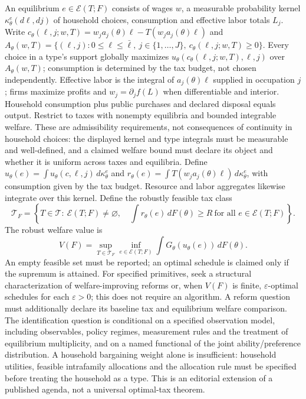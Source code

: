 \documentclass[11pt,a4paper]{article}
\begin{document}
An equilibrium \(e\in\mathcal E(T;F)\) consists of wages \(w\), a measurable probability kernel \(\kappa_\theta^e(d\ell,dj)\) of household choices, consumption and effective labor totals \(L_j\). Write \(c_\theta(\ell,j;w,T)=w_ja_j(\theta)\ell-T(w_ja_j(\theta)\ell)\) and \(A_\theta(w,T)=\{(\ell,j):0\leq\ell\leq\bar\ell,\ j\in\{1,\ldots,J\},\ c_\theta(\ell,j;w,T)\geq0\}\). Every choice in a type's support globally maximizes \(u_\theta(c_\theta(\ell,j;w,T),\ell,j)\) over \(A_\theta(w,T)\); consumption is determined by the tax budget, not chosen independently. Effective labor is the integral of \(a_j(\theta)\ell\) supplied in occupation \(j\); firms maximize profits and \(w_j=\partial_j f(L)\) when differentiable and interior. Household consumption plus public purchases and declared disposal equals output. Restrict to taxes with nonempty equilibria and bounded integrable welfare. These are admissibility requirements, not consequences of continuity in household choices: the displayed kernel and type integrals must be measurable and well-defined, and a claimed welfare bound must declare its object and whether it is uniform across taxes and equilibria. Define \(u_\theta(e)=\int u_\theta(c,\ell,j)\,d\kappa_\theta^e\) and \(r_\theta(e)=\int T(w_ja_j(\theta)\ell)\,d\kappa_\theta^e\), with consumption given by the tax budget. Resource and labor aggregates likewise integrate over this kernel. Define the robustly feasible tax class
\[
 \mathcal T_F=\left\{T\in\mathcal T:\ \mathcal E(T;F)\ne\varnothing,\quad
 \int r_\theta(e)\,dF(\theta)\ge R\ \text{for all }e\in\mathcal E(T;F)\right\}.
\]
The robust welfare value is
\[
 V(F)=\sup_{T\in\mathcal T_F}\inf_{e\in\mathcal E(T;F)}
 \int G_\theta(u_\theta(e))\,dF(\theta).
\]
An empty feasible set must be reported; an optimal schedule is claimed only if the supremum is attained. For specified primitives, seek a structural characterization of welfare-improving reforms or, when \(V(F)\) is finite, \(\varepsilon\)-optimal schedules for each \(\varepsilon>0\); this does not require an algorithm. A reform question must additionally declare its baseline tax and equilibrium welfare comparison. The identification question is conditional on a specified observation model, including observables, policy regimes, measurement rules and the treatment of equilibrium multiplicity, and on a named functional of the joint ability/preference distribution. A household bargaining weight alone is insufficient: household utilities, feasible intrafamily allocations and the allocation rule must be specified before treating the household as a type. This is an editorial extension of a published agenda, not a universal optimal-tax theorem.
\end{document}
